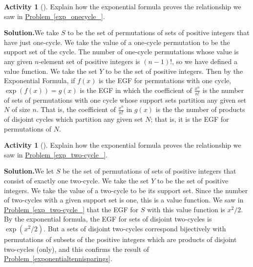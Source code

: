 \documentclass[10pt,]{book}
\theoremstyle{plain}
\theoremstyle{definition}
\newtheorem{activity}[project]{Activity}
\numberwithin{equation}{chapter}
\begin{document}
\begin{activity}[]\label{activity-388}
Explain how the exponential formula proves the relationship we saw in \hyperref[exp_onecycle_]{Problem~\ref{exp_onecycle_}}.%
\par\medskip\noindent%
\textbf{Solution.}\quad We take \(S\) to be the set of permutations of sets of positive integers that have just one-cycle. We take the value of a one-cycle permutation to be the support set of the cycle. The number of one-cycle permutations whose value is any given \(n\)-element set of positive integers is \((n-1)!\), so we have defined a value function. We take the set \(Y\) to be the set of positive integers. Then by the Exponential Formula, if \(f(x)\) is the EGF for permutations with one cycle, \(\exp(f(x))=g(x)\) is the EGF in which the coefficient of \(\frac{x^n}{n!}\) is the number of sets of permutations with one cycle whose support sets partition any given set \(N\) of size \(n\). That is, the coefficient of \(\frac{x^n}{n!}\) in \(g(x)\) is the the number of products of disjoint cycles which partition any given set \(N\); that is, it is the EGF for permutations of \(N\).%
\end{activity}
\begin{activity}[]\label{activity-389}
Explain how the exponential formula proves the relationship we saw in \hyperref[exp_two-cycle_]{Problem~\ref{exp_two-cycle_}}.%
\par\medskip\noindent%
\textbf{Solution.}\quad We let \(S\) be the set of permutations of sets of positive integers that consist of exactly one two-cycle. We take the set \(Y\) to be the set of positive integers. We take the value of a two-cycle to be its support set. Since the number of two-cycles with a given support set is one, this is a value function. We saw in \hyperref[exp_two-cycle_]{Problem~\ref{exp_two-cycle_}} that the EGF for \(S\) with this value function is \(x^2/2\). By the exponential formula, the EGF for sets of disjoint two-cycles is \(\exp(x^2/2)\). But a sets of disjoint two-cycles correspond bijectively with permutations of subsets of the positive integers which are products of disjoint two-cycles (only), and this confirms the result of \hyperref[exponentialtennisparings]{Problem~\ref{exponentialtennisparings}}.%
\end{activity}
\end{document}
